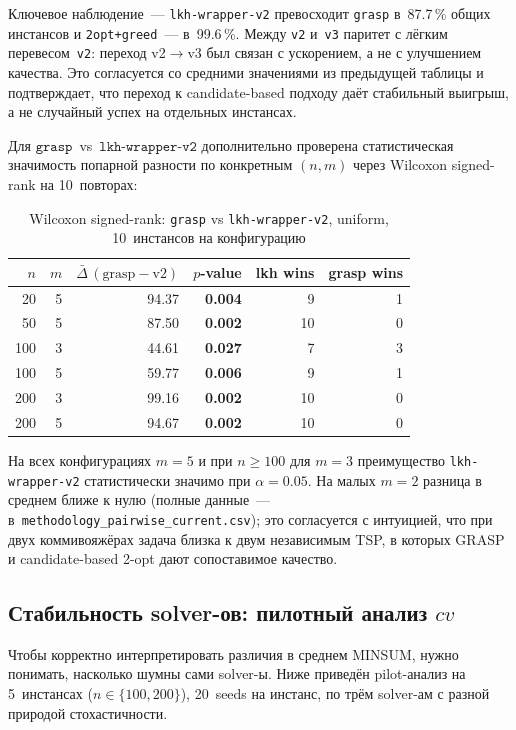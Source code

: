 \documentclass[14pt,a4paper]{extarticle}
\begin{document}
Ключевое наблюдение~--- \texttt{lkh-wrapper-v2} превосходит \texttt{grasp} в~87.7\,\% общих инстансов и \texttt{2opt+greed}~--- в~99.6\,\%. Между \texttt{v2} и~\texttt{v3} паритет с лёгким перевесом~\texttt{v2}: переход v2$\to$v3 был связан с ускорением, а не с улучшением качества. Это согласуется со средними значениями из предыдущей таблицы и подтверждает, что переход к candidate-based подходу даёт стабильный выигрыш, а не случайный успех на отдельных инстансах.

Для $\texttt{grasp}$~vs~$\texttt{lkh-wrapper-v2}$ дополнительно проверена статистическая значимость попарной разности по конкретным $(n, m)$ через Wilcoxon signed-rank на 10~повторах:

\begin{table}[H]
\centering
\caption{Wilcoxon signed-rank: \texttt{grasp} vs \texttt{lkh-wrapper-v2}, uniform, 10~инстансов на конфигурацию}
\small
\begin{tabular}{rrrrrr}
\toprule
$n$ & $m$ & $\bar{\Delta}\,(\mathrm{grasp}-\mathrm{v2})$ & $p$-value & lkh wins & grasp wins\\
\midrule
 20 & 5 &  94.37 & \textbf{0.004} &  9 & 1\\
 50 & 5 &  87.50 & \textbf{0.002} & 10 & 0\\
100 & 3 &  44.61 & \textbf{0.027} &  7 & 3\\
100 & 5 &  59.77 & \textbf{0.006} &  9 & 1\\
200 & 3 &  99.16 & \textbf{0.002} & 10 & 0\\
200 & 5 &  94.67 & \textbf{0.002} & 10 & 0\\
\bottomrule
\end{tabular}
\normalsize
\end{table}

На всех конфигурациях $m=5$ и при $n \geq 100$ для $m=3$ преимущество \texttt{lkh-wrapper-v2} статистически значимо при $\alpha=0.05$. На малых $m=2$ разница в среднем ближе к нулю (полные данные~--- в~\texttt{methodology\_pairwise\_current.csv}); это согласуется с интуицией, что при двух коммивояжёрах задача близка к двум независимым TSP, в которых GRASP и candidate-based 2-opt дают сопоставимое качество.

\subsection{Стабильность solver-ов: пилотный анализ $cv$}

Чтобы корректно интерпретировать различия в среднем MINSUM, нужно понимать, насколько шумны сами solver-ы. Ниже приведён pilot-анализ на 5~инстансах ($n \in \{100, 200\}$), 20~seeds на инстанс, по трём solver-ам с разной природой стохастичности.
\end{document}
